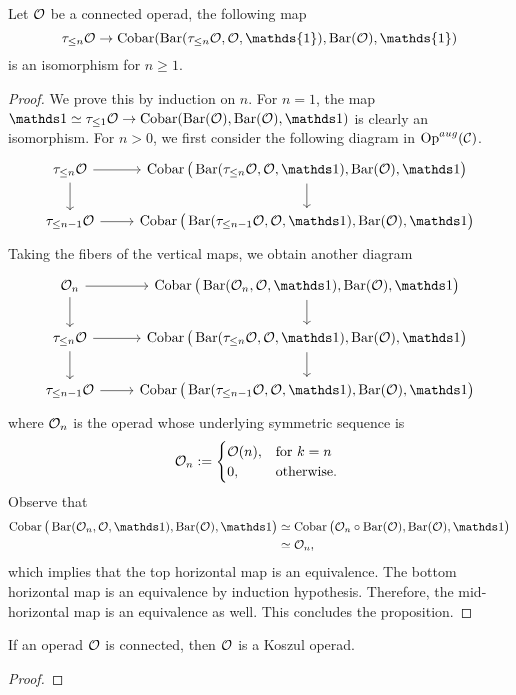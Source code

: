 \begin{proposition}
	Let ${\mathcal{O}}$ be a connected operad, the following map 
	$$
	\tau_{\leq n}\CO \rightarrow 
	\Cobar(\Barconstruction(\tau_{\leq n}\CO,\CO,\mathds{1}),\Barconstruction(\CO),\mathds{1})
	$$
	is an isomorphism for $n\geq 1$.
\end{proposition}
\begin{proof}
	We prove this by induction on $n$.
	For $n=1$, the map $\triv\simeq \tau_{\leq 1}\CO \rightarrow \Cobar(\Barconstruction(\CO),\Barconstruction(\CO),\triv)$ is clearly an isomorphism.
	For $n>0$, we first consider the following diagram in $\operatorname{Op}^{aug}({\mathcal{C}})$.
	\[
	\begin{tikzcd}
	\tau_{\leq n}\CO \ar[d]\ar[r] & \Cobar \big(\Barconstruction(\tau_{\leq n}\CO,\CO,\triv),\Barconstruction (\CO), \triv	 \big) \ar[d]  \\
	\tau_{\leq n-1}\CO \ar[r]    & 
	\Cobar \big(\Barconstruction(\tau_{\leq n-1}\CO,\CO,\triv),\Barconstruction (\CO), \triv	 \big)
	\end{tikzcd}
	\]
	Taking the fibers of the vertical maps, we obtain another diagram
		\[
	\begin{tikzcd}
	\CO_n \arrow[d] \arrow[r] & 
	\Cobar \big(\Barconstruction(\CO_n,\CO,\triv),\Barconstruction (\CO), \triv	 \big) \ar[d] \\
	\tau_{\leq n}\CO \ar[d]\ar[r] & \Cobar \big(\Barconstruction(\tau_{\leq n}\CO,\CO,\triv),\Barconstruction (\CO), \triv	 \big) \ar[d]  \\
	\tau_{\leq n-1}\CO \ar[r]    & 
	\Cobar \big(\Barconstruction(\tau_{\leq n-1}\CO,\CO,\triv),\Barconstruction (\CO), \triv	 \big)
	\end{tikzcd}
	\]
	where ${\mathcal{O}}_n$ is the operad whose underlying symmetric sequence is 
	$$
	 {\mathcal{O}}_n:= \begin{cases}
    {\mathcal{O}}(n), & \text{for } k = n \\
   0, & \text{otherwise. }         \\
  \end{cases}
	$$
	Observe that 
	\begin{align*}
			\Cobar \big(\Barconstruction(\CO_n,\CO,\triv),\Barconstruction (\CO), \triv \big) &
			\simeq \Cobar \big(\CO_n\circ \Barconstruction(\CO),\Barconstruction (\CO), \triv	 \big)\\
			& \simeq \CO_n,
	\end{align*}
	which implies that the top horizontal map is an equivalence. The bottom horizontal map is an equivalence by induction hypothesis. Therefore, the mid-horizontal map is an equivalence as well. This concludes the proposition.
	
\end{proof}
\begin{corollary}
		If an operad ${\mathcal{O}}$ is connected, then ${\mathcal{O}}$ is a Koszul operad.
\end{corollary}
\begin{proof}
	
\end{proof}



